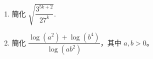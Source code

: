 \documentclass[11pt]{article}
\begin{document}
\begin{enumerate}
            \hrulefill
            
            \hrulefill

            \hrulefill
                
            \hrulefill
            
            \hrulefill
            
            \hrulefill
            
            \hrulefill
            
            \hrulefill
            
            \hrulefill
            
            \hrulefill
            
            \hrulefill
            
            \hrulefill
            
            \hrulefill
            
            \hrulefill
            
            \hrulefill
            
            \hrulefill

        \pagebreak
        \item 簡化 $\sqrt{\dfrac{3^{5k+2}}{27^k}}$.
        
        \hrulefill
            
            \hrulefill
            
            \hrulefill
            
            \hrulefill
            
            \hrulefill
            
            \hrulefill
            
            \hrulefill
            
            \hrulefill
            
            \hrulefill
            
            \hrulefill
            
            \hrulefill
            
            \hrulefill
            
            \hrulefill

        \item 簡化 $\dfrac{\log(a^2)+\log(b^4)}{\log(ab^2)}$，其中 $a,b>0$。
        
        \hrulefill
            
            \hrulefill
            

\end{enumerate}
\end{document}
